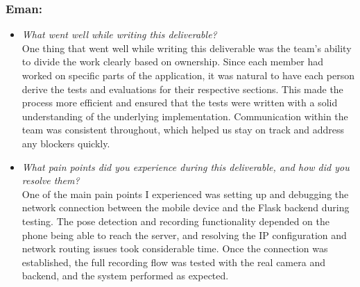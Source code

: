 \documentclass[12pt, titlepage]{article}
\begin{document}
\subsubsection*{Eman:}
\begin{itemize}
  \item \textit{What went well while writing this deliverable?} \\

    One thing that went well while writing this deliverable was the team's ability to divide the work 
	clearly based on ownership. Since each member had worked on specific parts of the application, it was 
	natural to have each person derive the tests and evaluations for their respective sections. This made the 
	process more efficient and ensured that the tests were written with a solid understanding of the underlying 
	implementation. Communication within the team was consistent throughout, which helped us stay on track and 
	address any blockers quickly.

  \item \textit{What pain points did you experience during this
    deliverable, and how did you resolve them?}\\

    One of the main pain points I experienced was setting up and debugging the network connection between 
	the mobile device and the Flask backend during testing. The pose detection and recording functionality 
	depended on the phone being able to reach the server, and resolving the IP configuration and network 
	routing issues took considerable time. Once the connection was established, the full recording flow was 
	tested with the real camera and backend, and the system performed as expected.

\end{itemize}
\end{document}
